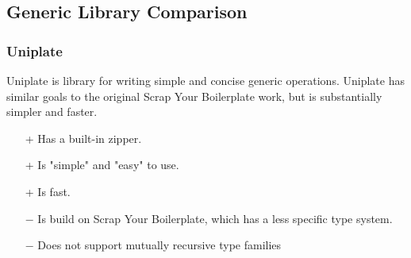 \subsection{Generic Library Comparison}

\subsubsection{Uniplate}

Uniplate is library for writing simple and concise generic operations. Uniplate has similar goals to the original Scrap Your Boilerplate work, but is substantially simpler and faster.

\begin{itemize}
    \item[+] Has a built-in zipper.
    \item[+] Is "simple" and "easy" to use.
    \item[+] Is fast. 
    \item[$-$] Is build on Scrap Your Boilerplate, which has a less specific type system. 
    \item[$-$] Does not support mutually recursive type families 
\end{itemize}